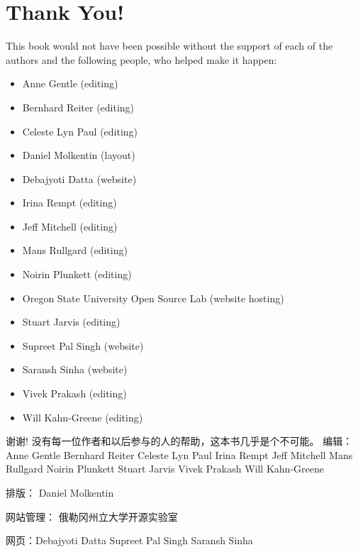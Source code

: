\section*{Thank You!}

This book would not have been possible without the support of each of the
authors and the following people, who helped make it happen:
\begin{itemize}
 \item Anne Gentle (editing)
 \item Bernhard Reiter (editing)
 \item Celeste Lyn Paul (editing)
 \item Daniel Molkentin (layout)
 \item Debajyoti Datta (website)
 \item Irina Rempt (editing)
 \item Jeff Mitchell (editing)
 \item Mans Rullgard (editing)
 \item Noirin Plunkett (editing)
 \item Oregon State University Open Source Lab (website hosting)
 \item Stuart Jarvis (editing)
 \item Supreet Pal Singh (website)
 \item Saransh Sinha (website)
 \item Vivek Prakash (editing)
 \item Will Kahn-Greene (editing)
\end{itemize}

\newpage

{谢谢! }
没有每一位作者和以后参与的人的帮助，这本书几乎是个不可能。
 编辑：
 Anne Gentle 
Bernhard Reiter
Celeste Lyn Paul 
Irina Rempt
Jeff Mitchell
Mans Rullgard
Noirin Plunkett
Stuart Jarvis 
Vivek Prakash
Will Kahn-Greene 

排版：
Daniel Molkentin 

网站管理：
俄勒冈州立大学开源实验室

网页：Debajyoti Datta 
Supreet Pal Singh 
Saransh Sinha 
